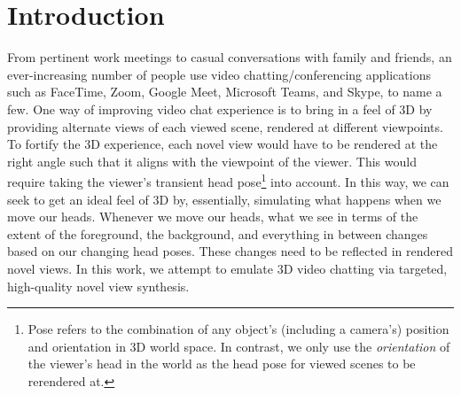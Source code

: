 \chapter{Introduction}\label{ch1:introduction}
 
From pertinent work meetings to casual conversations with family and friends, an ever-increasing number of people use video chatting/conferencing applications such as FaceTime, Zoom, Google Meet, Microsoft Teams, and Skype, to name a few. One way of improving video chat experience is to bring in a feel of 3D by providing alternate views of each viewed scene, rendered at different viewpoints. To fortify the 3D experience, each novel view would have to be rendered at the right angle such that it aligns with the viewpoint of the viewer. This would require taking the viewer's transient head pose\footnote{Pose refers to the combination of any object's (including a camera's) position and orientation in 3D world space. In contrast, we only use the \textit{orientation} of the viewer's head in the world as the head pose for viewed scenes to be rerendered at.} into account. In this way, we can seek to get an ideal feel of 3D by, essentially, simulating what happens when we move our heads. Whenever we move our heads, what we see in terms of the extent of the foreground, the background, and everything in between changes based on our changing head poses. These changes need to be reflected in rendered novel views. In this work, we attempt to emulate 3D video chatting via targeted, high-quality novel view synthesis.


